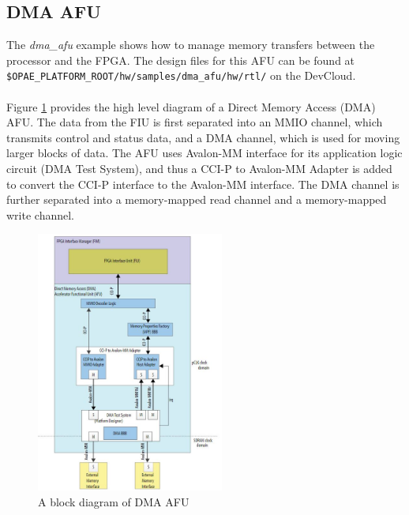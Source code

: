 \documentclass[11pt, twoside, pdftex]{article}
\begin{document}
\subsection{DMA AFU}
The {\it dma\_afu} example shows how to manage memory transfers between the processor and the FPGA. The design files for this AFU can be found at \verb|$OPAE_PLATFORM_ROOT/hw/samples/dma_afu/hw/rtl/| on the DevCloud.\\
\\
Figure \ref{fig:DMA_AFU} provides the high level diagram of a Direct Memory Access (DMA) AFU. The data from the FIU is first separated into an MMIO channel, which transmits control and status data, and a DMA channel, which is used for moving larger blocks of data. The AFU uses Avalon-MM interface for its application logic circuit (DMA Test System), and thus a CCI-P to Avalon-MM Adapter is added to convert the CCI-P interface to the Avalon-MM interface. The DMA channel is further separated into a memory-mapped read channel and a memory-mapped write channel.
\begin{figure}[H]
    \begin{center}
        \includegraphics[width=0.55\textwidth]{figures/DMAAFU.JPG}
    \end{center}
    \caption{A block diagram of DMA AFU}
    \label{fig:DMA_AFU}
\end{figure}
\end{document}
